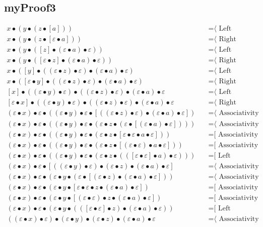 \documentclass{article}
\begin{document}
\subsection{myProof3}
\begin{align*}
x • (y • (z • [a]))
  & \quad \text{=⟨ Left neutrality ]}\\
x • (y • (z • [ε • a]))
  & \quad \text{=⟨ Right neutrality ]}\\
x • (y • ([z] • (ε • a) • ε))
  & \quad \text{=⟨ Left neutrality ]}\\
x • (y • ([ε • z] • (ε • a) • ε))
  & \quad \text{=⟨ Right neutrality ]}\\
x • ([y] • ((ε • z) • ε) • (ε • a) • ε)
  & \quad \text{=⟨ Left neutrality ]}\\
x • ([ε • y] • ((ε • z) • ε) • (ε • a) • ε)
  & \quad \text{=⟨ Right neutrality ]}\\
[x] • ((ε • y) • ε) • ((ε • z) • ε) • (ε • a) • ε
  & \quad \text{=⟨ Left neutrality ]}\\
[ε • x] • ((ε • y) • ε) • ((ε • z) • ε) • (ε • a) • ε
  & \quad \text{=⟨ Right neutrality ]}\\
(ε • x) • ε • ((ε • y) • ε • [((ε • z) • ε) • (ε • a) • ε])
  & \quad \text{=⟨ Associativity ]}\\
(ε • x) • ε • ((ε • y) • ε • (ε • z • (ε • [(ε • a) • ε])))
  & \quad \text{=⟨ Associativity ]}\\
(ε • x) • ε • ((ε • y) • ε • (ε • z • [ε • ε • a • ε]))
  & \quad \text{=[ Associativity ⟩}\\
(ε • x) • ε • ((ε • y) • ε • (ε • z • [(ε • ε) • a • ε]))
  & \quad \text{=[ Associativity ⟩}\\
(ε • x) • ε • ((ε • y) • ε • (ε • z • (([ε • ε] • a) • ε)))
  & \quad \text{=[ Left neutrality ⟩}\\
(ε • x) • ε • [((ε • y) • ε) • (ε • z) • (ε • a) • ε]
  & \quad \text{=⟨ Associativity ]}\\
(ε • x) • ε • (ε • y • (ε • [(ε • z) • (ε • a) • ε]))
  & \quad \text{=⟨ Associativity ]}\\
(ε • x) • ε • (ε • y • [ε • ε • z • (ε • a) • ε])
  & \quad \text{=[ Associativity ⟩}\\
(ε • x) • ε • (ε • y • [(ε • ε) • z • (ε • a) • ε])
  & \quad \text{=[ Associativity ⟩}\\
(ε • x) • ε • (ε • y • (([ε • ε] • z) • (ε • a) • ε))
  & \quad \text{=[ Left neutrality ⟩}\\
((ε • x) • ε) • (ε • y) • (ε • z) • (ε • a) • ε
  & \quad \text{=⟨ Associativity ]}\\

\end{align*}
\end{document}
